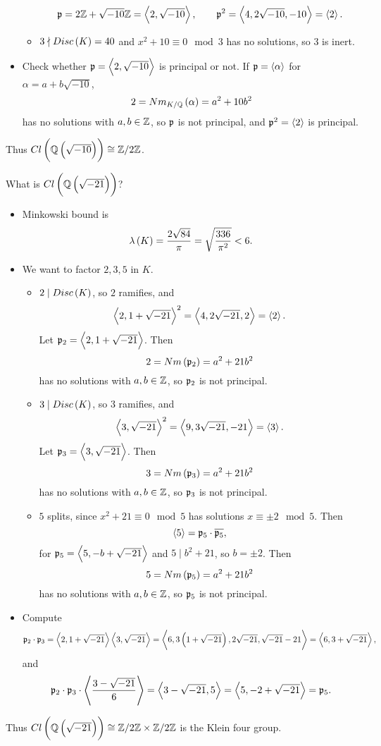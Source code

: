 \begin{example*}
\begin{itemize}
\begin{itemize}
$$ \mathfrak{p} = 2\mathbb{Z} + \sqrt{-10}\mathbb{Z} = \left\langle 2, \sqrt{-10} \right\rangle, \qquad \mathfrak{p}^2 = \left\langle 4, 2\sqrt{-10}, -10 \right\rangle = \left\langle 2 \right\rangle. $$
\item $ 3 \nmid Disc\br{K} = 40 $ and $ x^2 + 10 \equiv 0 \mod 3 $ has no solutions, so $ 3 $ is inert.
\end{itemize}
\item Check whether $ \mathfrak{p} = \left\langle 2, \sqrt{-10} \right\rangle $ is principal or not. If $ \mathfrak{p} = \left\langle \alpha \right\rangle $ for $ \alpha = a + b\sqrt{-10} $,
$$ 2 = Nm_{K / \Q}\br{\alpha} = a^2 + 10b^2 $$
has no solutions with $ a, b \in \mathbb{Z} $, so $ \mathfrak{p} $ is not principal, and $ \mathfrak{p}^2 = \left\langle 2 \right\rangle $ is principal.
\end{itemize}
Thus $ Cl\br{\Q\br{\sqrt{-10}}} \cong \Z / 2\Z $.
\end{example*}

\pagebreak

\begin{example*}
What is $ Cl\br{\Q\br{\sqrt{-21}}} $?
\begin{itemize}
\item Minkowski bound is
$$ \lambda\br{K} = \dfrac{2\sqrt{84}}{\pi} = \sqrt{\dfrac{336}{\pi^2}} < 6. $$
\item We want to factor $ 2, 3, 5 $ in $ K $.
\begin{itemize}
\item $ 2 \mid Disc\br{K} $, so $ 2 $ ramifies, and
$$ \left\langle 2, 1 + \sqrt{-21} \right\rangle^2 = \left\langle 4, 2\sqrt{-21}, 2 \right\rangle = \left\langle 2 \right\rangle. $$
Let $ \mathfrak{p}_2 = \left\langle 2, 1 + \sqrt{-21} \right\rangle $. Then
$$ 2 = Nm\br{\pp_2} = a^2 + 21b^2 $$
has no solutions with $ a, b \in \mathbb{Z} $, so $ \mathfrak{p}_2 $ is not principal.
\item $ 3 \mid Disc\br{K} $, so $ 3 $ ramifies, and
$$ \left\langle 3, \sqrt{-21} \right\rangle^2 = \left\langle 9, 3\sqrt{-21}, -21 \right\rangle = \left\langle 3 \right\rangle. $$
Let $ \mathfrak{p}_3 = \left\langle 3, \sqrt{-21} \right\rangle $. Then
$$ 3 = Nm\br{\pp_3} = a^2 + 21b^2 $$
has no solutions with $ a, b \in \mathbb{Z} $, so $ \mathfrak{p}_3 $ is not principal.
\item $ 5 $ splits, since $ x^2 + 21 \equiv 0 \mod 5 $ has solutions $ x \equiv \pm 2 \mod 5 $. Then
$$ \left\langle 5 \right\rangle = \mathfrak{p}_5 \cdot \overline{\mathfrak{p}_5}, $$
for $ \mathfrak{p}_5 = \left\langle 5, -b + \sqrt{-21} \right\rangle $ and $ 5 \mid b^2 + 21 $, so $ b = \pm 2 $. Then
$$ 5 = Nm\br{\pp_5} = a^2 + 21b^2 $$
has no solutions with $ a, b \in \mathbb{Z} $, so $ \mathfrak{p}_5 $ is not principal.
\end{itemize}
\item Compute
$$ \pp_2 \cdot \pp_3 = \abr{2, 1 + \sqrt{-21}}\abr{3, \sqrt{-21}} = \abr{6, 3\br{1 + \sqrt{-21}}, 2\sqrt{-21}, \sqrt{-21} - 21} = \abr{6, 3 + \sqrt{-21}}, $$
and
$$ \mathfrak{p}_2 \cdot \mathfrak{p}_3 \cdot \left\langle \dfrac{3 - \sqrt{-21}}{6} \right\rangle = \left\langle 3 - \sqrt{-21}, 5 \right\rangle = \left\langle 5, -2 + \sqrt{-21} \right\rangle = \mathfrak{p}_5. $$
\end{itemize}
Thus $ Cl\br{\Q\br{\sqrt{-21}}} \cong \Z / 2\Z \times \Z / 2\Z $ is the Klein four group.
\end{example*}


